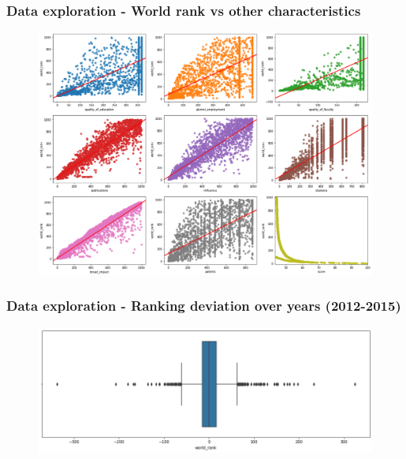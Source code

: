 \documentclass[mathserif,notheorems,11pt]{beamer}
\begin{document}
\begin{frame}
\frametitle{Data exploration - World rank vs  other characteristics}
\begin{figure}
	\centering
	\includegraphics[width=0.9\linewidth]{graphs/rank_scatterplot}
\end{figure}

\end{frame}

\begin{frame}
\frametitle{Data exploration - Ranking deviation over years (2012-2015)}
\begin{figure}
	\centering
	\includegraphics[width=1\linewidth]{graphs/world_rank_diff_bp}
\end{figure}
\end{frame}
\end{document}
